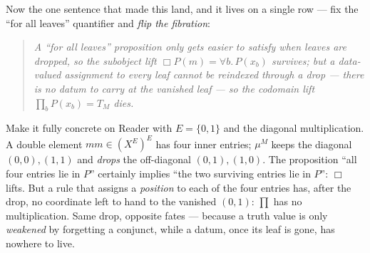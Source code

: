 \documentclass[11pt,a4paper]{book}
\theoremstyle{plain}
\theoremstyle{definition}
\theoremstyle{remark}
\begin{document}
\begin{teachbox}
Now the one sentence that made this land, and it lives on a single row --- fix the ``for all leaves''
quantifier and \emph{flip the fibration}:
\begin{quote}\itshape
A ``for all leaves'' \emph{proposition} only gets \emph{easier} to satisfy when leaves are dropped, so the
subobject lift $\Box P(m)=\forall b.\,P(x_{b})$ survives; but a \emph{data}-valued assignment to
\emph{every} leaf cannot be reindexed through a drop --- there is no datum to carry at the vanished leaf ---
so the codomain lift $\prod_{b}P(x_{b})=T_{M}$ dies.
\end{quote}
Make it fully concrete on Reader with $E=\{0,1\}$ and the diagonal multiplication. A double element
$mm\in(X^{E})^{E}$ has four inner entries; $\mu^{M}$ keeps the diagonal $(0,0),(1,1)$ and \emph{drops} the
off-diagonal $(0,1),(1,0)$. The proposition ``all four entries lie in $P$'' certainly implies ``the two
surviving entries lie in $P$'': $\Box$ lifts. But a rule that assigns a \emph{position} to each of the four
entries has, after the drop, no coordinate left to hand to the vanished $(0,1)$: $\prod$ has no
multiplication. Same drop, opposite fates --- because a truth value is only \emph{weakened} by forgetting a
conjunct, while a datum, once its leaf is gone, has nowhere to live.


\end{teachbox}
\end{document}
